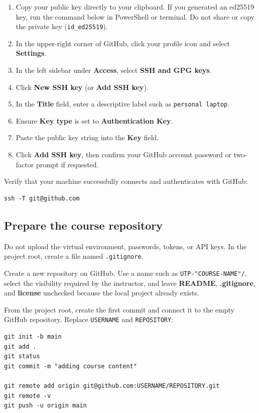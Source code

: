 \begin{enumerate}[leftmargin=1.7em]
  \item Copy your public key directly to your clipboard. If you generated an ed25519 key, run the command below in PowerShell or terminal. Do not share or copy the private key (\texttt{id\_ed25519}).
  \item In the upper-right corner of GitHub, click your profile icon and select \textbf{Settings}.
  \item In the left sidebar under \textbf{Access}, select \textbf{SSH and GPG keys}.
  \item Click \textbf{New SSH key} (or \textbf{Add SSH key}).
  \item In the \textbf{Title} field, enter a descriptive label such as \texttt{personal laptop}.
  \item Ensure \textbf{Key type} is set to \textbf{Authentication Key}.
  \item Paste the public key string into the \textbf{Key} field.
  \item Click \textbf{Add SSH key}, then confirm your GitHub account password or two-factor prompt if requested.
\end{enumerate}

\noindent Verify that your machine successfully connects and authenticates with GitHub:

\begin{lstlisting}[style=utpterminal]
ssh -T git@github.com
\end{lstlisting}


\subsection{Prepare the course repository}

Do not upload the virtual environment, passwords, tokens, or API keys. In the project root, create a file named \texttt{.gitignore}.

Create a new repository on GitHub. Use a name such as \texttt{UTP-"COURSE-NAME"/}, select the visibility required by the instructor, and leave \textbf{README}, \textbf{.gitignore}, and \textbf{license} unchecked because the local project already exists.

From the project root, create the first commit and connect it to the empty
GitHub repository. Replace \texttt{USERNAME} and \texttt{REPOSITORY}:

\begin{lstlisting}[style=utpterminal]
git init -b main
git add .
git status
git commit -m "adding course content"

git remote add origin git@github.com:USERNAME/REPOSITORY.git
git remote -v
git push -u origin main
\end{lstlisting}


